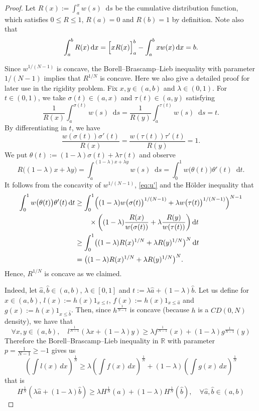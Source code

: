 \documentclass[sts]{imsart}
\theoremstyle{definition}
\theoremstyle{remark}
\newcommand{\R}{\mathbb{R}}
\newcommand*\diff{\mathop{}\!\mathrm{d}}
\begin{document}
\begin{proof}
Let $R(x):=\int_a^x w(s) \diff s$ be the cumulative distribution function, which satisfies $0 \le R \le 1$, $R(a)=0$ and $R(b)=1$ by definition.
Note also that
\begin{equation}\label{eq:intR}
\int_a^b R(x) \diff x
=\Bigl[ xR(x) \Bigr]_a^b -\int_a^b xw(x) \diff x
=b.
\end{equation}

Since $w^{1/(N-1)}$ is concave, the Borell--Brascamp--Lieb inequality \cite{Borell,BL} with parameter $1/(N-1)$ implies that $R^{1/N}$ is concave.
Here we also give a detailed proof for later use in the rigidity problem.
Fix $x,y \in (a,b)$ and $\lambda \in (0,1)$.
For $t \in (0,1)$, we take $\sigma(t) \in (a,x)$ and $\tau(t) \in (a,y)$ satisfying
\[ \frac{1}{R(x)} \int_a^{\sigma(t)} w(s) \diff s = \frac{1}{R(y)} \int_a^{\tau(t)} w(s) \diff s =t. \]
By differentiating in $t$, we have
\begin{equation}\label{eq:u'}
\frac{w(\sigma(t)) \sigma'(t)}{R(x)} = \frac{w(\tau(t)) \tau'(t)}{R(y)} =1.
\end{equation}
We put $\theta(t) :=(1-\lambda) \sigma(t) +\lambda \tau(t)$ and observe
\[ R\bigl( (1-\lambda)x +\lambda y \bigr)
 = \int_a^{(1-\lambda)x +\lambda y} w(s) \diff s
 = \int_0^1 w\bigl( \theta(t) \bigr) \theta'(t) \diff t. \]
It follows from the concavity of $w^{1/(N-1)}$, \eqref{eq:u'} and the H\"older inequality that
\begin{align}
\begin{split} \label{eq:BBL}
\int_0^1 w\bigl( \theta(t) \bigr) \theta'(t) \diff t
&\ge \int_0^1 \Bigl( (1-\lambda) w\bigl( \sigma(t) \bigr)^{1/(N-1)} +\lambda w\bigl( \tau(t) \bigr)^{1/(N-1)} \Bigr)^{N-1} \\
&\qquad \times \biggl( (1-\lambda) \frac{R(x)}{w(\sigma(t))} +\lambda \frac{R(y)}{w(\tau(t))} \biggr) \diff t \\
&\ge \int_0^1 \bigl( (1-\lambda) R(x)^{1/N} +\lambda R(y)^{1/N} \bigr)^N \diff t \\
&= \bigl( (1-\lambda) R(x)^{1/N} +\lambda R(y)^{1/N} \bigr)^N.
\end{split}
\end{align}
Hence, $R^{1/N}$ is concave as we claimed.


Indeed, let $\hat{a},\hat{b}\in (a,b)$, $\lambda\in [0,1]$ and $t:=\lambda \hat{a}+(1-\lambda)\hat{b}$.
Let us define for $x\in (a,b)$, $l(x) := h(x) 1_{x\leq t}$, $f(x):=h(x)1_{x\leq\hat{a}}$ and $g(x):=h(x)1_{x\leq \hat{b}}$.
Then, since $h^\frac{1}{N-1}$ is concave (because $h$ is a $CD(0,N)$ density), we have that
$$\forall x,y \in (a,b), \quad l^\frac{1}{N-1}(\lambda x+(1-\lambda)y)\geq \lambda f^\frac{1}{N-1}(x) + (1-\lambda)g^\frac{1}{N-1}(y) $$
Therefore the Borell--Brascamp--Lieb inequality in $\R$ with parameter $p=\frac{1}{N-1}\geq -1$ gives us
$$ \left( \int l(x)\,dx \right)^\frac{1}{N} \geq \lambda\left(\int f(x)\,dx\right)^\frac{1}{N} +(1-\lambda)\left( \int g(x)\,dx\right)^\frac{1}{N}  $$
that is
$$  H^\frac{1}{N}(\lambda \hat{a} + (1-\lambda)\hat{b})  \geq \lambda H^\frac{1}{N}(\hat{a}) +(1-\lambda)H^\frac{1}{N}(\hat{b}), \quad \forall \hat{a},\hat{b}\in (a,b) $$
\fi%



\end{proof}
\end{document}
